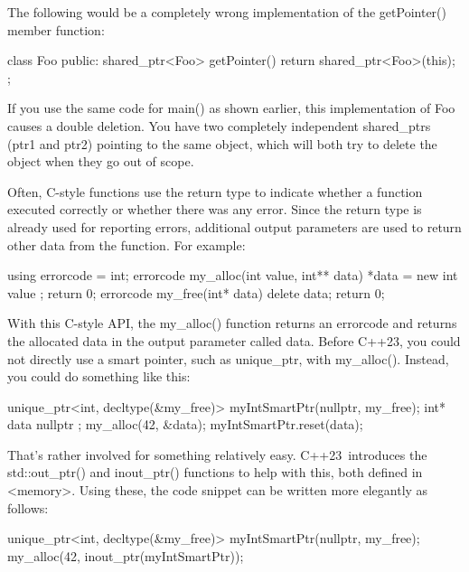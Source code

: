 The following would be a completely wrong implementation of the getPointer() member function:

\begin{cpp}
class Foo
{
    public:
        shared_ptr<Foo> getPointer() {
            return shared_ptr<Foo>(this);
        }
};
\end{cpp}

If you use the same code for main() as shown earlier, this implementation of Foo causes a double deletion. You have two completely independent shared\_ptrs (ptr1 and ptr2) pointing to the same object, which will both try to delete the object when they go out of scope.



Often, C-style functions use the return type to indicate whether a function executed correctly or whether there was any error. Since the return type is already used for reporting errors, additional output parameters are used to return other data from the function. For example:

\begin{cpp}
using errorcode = int;
errorcode my_alloc(int value, int** data) { *data = new int { value }; return 0; }
errorcode my_free(int* data) { delete data; return 0; }
\end{cpp}

With this C-style API, the my\_alloc() function returns an errorcode and returns the allocated data in the output parameter called data. Before C++23, you could not directly use a smart pointer, such as unique\_ptr, with my\_alloc(). Instead, you could do something like this:

\begin{cpp}
unique_ptr<int, decltype(&my_free)> myIntSmartPtr(nullptr, my_free);
int* data { nullptr };
my_alloc(42, &data);
myIntSmartPtr.reset(data);
\end{cpp}

That’s rather involved for something relatively easy. C++23 introduces the std::out\_ptr() and inout\_ptr() functions to help with this, both defined in <memory>. Using these, the code snippet can be written more elegantly as follows:

\begin{cpp}
unique_ptr<int, decltype(&my_free)> myIntSmartPtr(nullptr, my_free);
my_alloc(42, inout_ptr(myIntSmartPtr));
\end{cpp}

